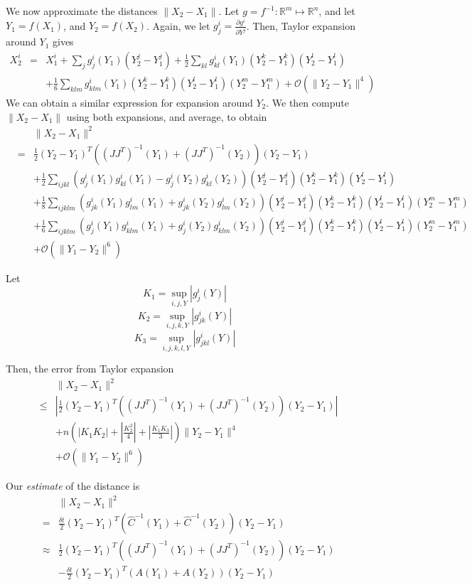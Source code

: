 \documentclass[12pt]{article}
\begin{document}
We now approximate the distances $\| X_2 - X_1 \|$.
%
Let $g = f^{-1}: \mathbb{R}^m \mapsto \mathbb{R}^n$, and let $Y_1 = f(X_1)$, and $Y_2 = f(X_2)$.
%
Again, we let $g_j^i = \frac{\partial g^i}{\partial Y^j}$.
%
Then, Taylor expansion around $Y_1$ gives
%
\begin{eqnarray}
X_2^i &=& X_1^i + \sum_j g_j^i (Y_1) (Y^j_2 - Y^j_1 ) 
+ \frac{1}{2} \sum_{kl}  g^i_{kl} (Y_1) (Y^k_2 - Y^k_1)(Y^l_2 - Y^l_1) \\
&&+ \frac{1}{6} \sum_{klm}  g^i_{klm} (Y_1) (Y^k_2 - Y^k_1)(Y^l_2 - Y^l_1) (Y^m_2 - Y^m_1) 
+ \mathcal{O}( \|Y_2 - Y_1\|^4 )
\end{eqnarray}
%
We can obtain a similar expression for expansion around $Y_2$.
%
We then compute $\| X_2 - X_1\|$ using both expansions, and average, to obtain
%
\begin{eqnarray}
&&\| X_2 - X_1 \|^2 \\
&=& \frac{1}{2} (Y_2 - Y_1 )^T ((J J^T)^{-1} (Y_1) + (J J^T)^{-1}(Y_2)) (Y_2 - Y_1 ) \\
&& + \frac{1}{2} \sum_{ijkl} \left( g_j^i (Y_1) g^i_{kl} (Y_1) - g_j^i (Y_2) g^i_{kl} (Y_2) \right) (Y^j_2 - Y^j_1 )  (Y^k_2 - Y^k_1)(Y^l_2 - Y^l_1) \\
&& + \frac{1}{8} \sum_{ijklm}  \left( g^i_{jk} (Y_1) g^i_{lm} (Y_1) + g^i_{jk} (Y_2) g^i_{lm} (Y_2)  \right) (Y^j_2 - Y^j_1) (Y^k_2 - Y^k_1) (Y^l_2 - Y^l_1) (Y^m_2 - Y^m_1) \\
&& + \frac{1}{6} \sum_{ijklm}  \left( g^i_{j} (Y_1) g^i_{klm} (Y_1) + g^i_{j} (Y_2) g^i_{klm} (Y_2)  \right)(Y^j_2 - Y^j_1) (Y^k_2 - Y^k_1) (Y^l_2 - Y^l_1) (Y^m_2 - Y^m_1) \\
&& + \mathcal{O} (\|Y_1 - Y_2 \|^6 ) 
\end{eqnarray}

Let 
$$K_1 = \sup_{i,j,Y} |g_j^i(Y)|$$
$$K_2 = \sup_{i,j,k,Y} |g_{jk}^i(Y)|$$
$$K_3 = \sup_{i,j,k,l,Y} |g_{jkl}^i(Y)|$$

Then, the error from Taylor expansion 
\begin{eqnarray}
&&\| X_2 - X_1 \|^2 \\
&\le&  \left| \frac{1}{2} (Y_2 - Y_1 )^T ((J J^T)^{-1} (Y_1) + (J J^T)^{-1}(Y_2)) (Y_2 - Y_1 ) \right| \\
&& + n \left( \left| K_1 K_2 \right| + \left| \frac{ K_2^2}{4} \right|  + \left| \frac{K_1 K_3}{3} \right|  \right) \| Y_2 - Y_1 \| ^4  \\
&& + \mathcal{O} (\|Y_1 - Y_2 \|^6 ) 
\end{eqnarray}

Our {\em estimate} of the distance is 
\begin{eqnarray}
&&\| X_2 - X_1 \|^2 \\
&=& \frac{\delta t}{2} (Y_2 - Y_1)^T (\hat{C}^{-1} (Y_1) + \hat{C}^{-1}(Y_2)) (Y_2 - Y_1)\\
&\approx & \frac{1}{2} (Y_2 - Y_1)^T \left((J J^T)^{-1}(Y_1)  + (J J^T)^{-1}(Y_2) \right) (Y_2 - Y_1) \\
&& - \frac{\delta t}{2} (Y_2 - Y_1)^T \left( A(Y_1) + A(Y_2) \right) (Y_2 - Y_1)
\end{eqnarray}
\end{document}
